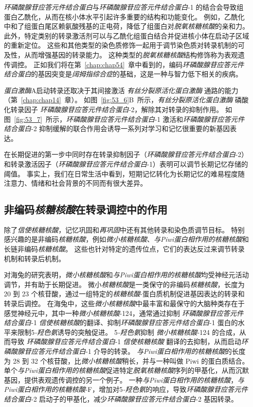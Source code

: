 \textit{环磷酸腺苷应答元件结合蛋白}与\textit{环磷酸腺苷应答元件结合蛋白}-1 的结合会导致组蛋白乙酰化，从而在核小体水平引起许多重要的结构和功能变化。
例如，乙酰化中和了组蛋白尾区赖氨酸残基的正电荷，降低了组蛋白对\textit{脱氧核糖核酸}的亲和力。
此外，特定类别的转录激活剂可以与乙酰化组蛋白结合并促进核小体在启动子区域的重新定位。
这些和其他类型的染色质修饰一起用于调节染色质对转录机制的可及性，从而增强基因的转录能力。
这种类型的\textit{脱氧核糖核酸}结构修饰称为表观遗传调控。
正如我们将在第~\ref{chap:chap54}~章中看到的，编码\textit{环磷酸腺苷应答元件结合蛋白}的基因突变是\textit{阔拇指综合症}的基础，这是一种与智力低下相关的疾病。


\textit{蛋白激酶}A启动转录还取决于其间接激活 \textit{有丝分裂原活化蛋白激酶} 通路的能力（第~\ref{chap:chap14}~章）。
如图~\ref{fig:53_6}B~所示，\textit{有丝分裂原活化蛋白激酶} 磷酸化转录因子 \textit{环磷酸腺苷应答元件结合蛋白}-2，解除其对转录的抑制作用。
如图~\ref{fig:53_7}~所示，\textit{环磷酸腺苷应答元件结合蛋白}-1 激活和\textit{环磷酸腺苷应答元件结合蛋白}-2 抑制缓解的联合作用会诱导一系列对学习和记忆很重要的新基因表达。


在长期促进的第一步中同时存在转录抑制因子（\textit{环磷酸腺苷应答元件结合蛋白}-2）和转录激活因子（\textit{环磷酸腺苷应答元件结合蛋白}-1）表明可以调节长期记忆存储的阈值。
事实上，我们在日常生活中看到，短期记忆转化为长期记忆的难易程度随注意力、情绪和社会背景的不同而有很大差异。



\subsection{非编码\textit{核糖核酸}在转录调控中的作用}

除了\textit{信使核糖核酸}，记忆巩固和\textit{再巩固}中还有其他转录和染色质调节目标。
特别感兴趣的是非编码\textit{核糖核酸}，例如\textit{微小核糖核酸}、\textit{与Piwi蛋白相作用的核糖核酸}和长链非编码\textit{核糖核酸}。
这些也针对特定的遗传位点，它们的表达反过来调节转录机制和转录后机制。


对海兔的研究表明，\textit{微小核糖核酸}和\textit{与Piwi蛋白相作用的核糖核酸}均受神经元活动调节，并有助于长期促进。
微小\textit{核糖核酸}是一类保守的非编码\textit{核糖核酸}，长度为 20 到 23 个核苷酸，通过一组特定的\textit{核糖核酸}-蛋白质机制促进基因表达的转录和转录后调控。
在海兔中，这些\textit{微小核糖核酸}中最丰富和最保守的大脑种类存在于感觉神经元中，其中一种\textit{微小核糖核酸}-124，通常通过抑制 \textit{环磷酸腺苷应答元件结合蛋白}-1 \textit{信使核糖核酸}的翻译、抑制\textit{环磷酸腺苷应答元件结合蛋白}-1 蛋白的水平来限制5\textit{-羟色氨}诱导的突触促进。
5\textit{-羟色氨}抑制 \textit{微小核糖核酸}-124 的合成，从而导致 \textit{环磷酸腺苷应答元件结合蛋白}-1 \textit{信使核糖核酸} 翻译的去抑制，从而启动\textit{环磷酸腺苷应答元件结合蛋白}-1 介导的转录。
\textit{与Piwi蛋白相作用的核糖核酸}的长度为 28 到 32 个核苷酸，比\textit{微小核糖核酸}稍长，并与一种叫做 Piwi 的蛋白质结合。
单个\textit{与Piwi蛋白相作用的核糖核酸}促进特定\textit{脱氧核糖核酸}序列的甲基化，从而沉默基因，提供表观遗传调控的另一个例子。
一种\textit{与Piwi蛋白相作用的核糖核酸}，\textit{与Piwi蛋白相作用的核糖核酸}-F，增加对5\textit{-羟色氨}的响应，导致\textit{环磷酸腺苷应答元件结合蛋白}-2 启动子的甲基化，减少\textit{环磷酸腺苷应答元件结合蛋白}-2 基因转录。


